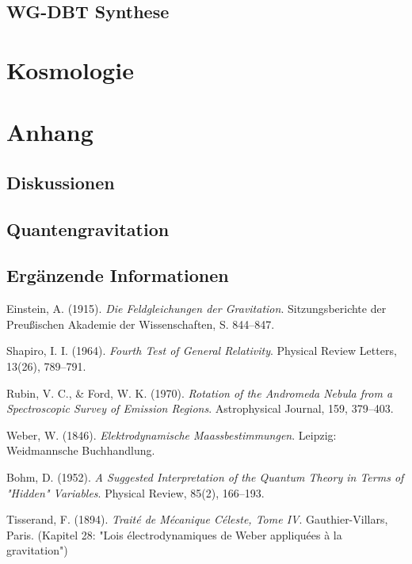 \documentclass{book}
\numberwithin{equation}{section}
\begin{document}
\chapter{WG-DBT Synthese}

\part{Kosmologie}



\part{Anhang}
\chapter{Diskussionen}
\label{chapter:diskussion}

\chapter{Quantengravitation}






\chapter{Ergänzende Informationen}
\label{chapter:information}


\begin{thebibliography}{9}

Einstein, A. (1915). 
\textit{Die Feldgleichungen der Gravitation}. 
Sitzungsberichte der Preußischen Akademie der Wissenschaften, 
S. 844–847.

Shapiro, I. I. (1964). 
\textit{Fourth Test of General Relativity}. 
Physical Review Letters, 13(26), 789–791.

Rubin, V. C., \& Ford, W. K. (1970). 
\textit{Rotation of the Andromeda Nebula from a Spectroscopic Survey of Emission Regions}. 
Astrophysical Journal, 159, 379–403.

Weber, W. (1846). 
\textit{Elektrodynamische Maassbestimmungen}. 
Leipzig: Weidmannsche Buchhandlung.

Bohm, D. (1952). 
\textit{A Suggested Interpretation of the Quantum Theory in Terms of "Hidden" Variables}. 
Physical Review, 85(2), 166–193.

Tisserand, F. (1894). 
\textit{Traité de Mécanique Céleste, Tome IV}. 
Gauthier-Villars, Paris. 
(Kapitel 28: "Lois électrodynamiques de Weber appliquées à la gravitation")

\end{thebibliography}
\end{document}
